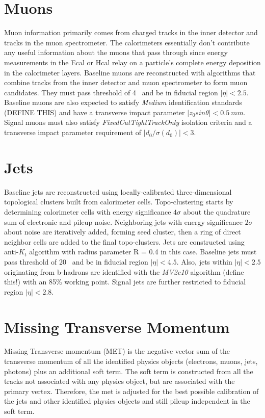\section{Muons}
Muon information primarily comes from charged tracks in the inner detector and tracks in the muon spectrometer.  The calorimeters essentially don't contribute any useful information about the muons that pass through since energy measurements in the Ecal or Hcal relay on a particle's complete energy deposition in the calorimeter layers.   Baseline muons are reconstructed with algorithms that combine tracks from the inner detector and muon spectrometer to form muon candidates.  They must pass \pt{} threshold of 4 ~\GeV and be in fiducial region $|\eta | < 2.5$. Baseline muons are also expected to satisfy \textit{Medium} identification standards (DEFINE THIS) and have a transverse impact parameter $|z_0sin\theta| < 0.5~mm$.  Signal muons must also satisfy \textit{FixedCutTightTrackOnly} isolation criteria and a transverse impact parameter requirement of $|d_0/\sigma(d_0)| < 3$.

\section{Jets}
Baseline jets are reconstructed using locally-calibrated three-dimensional topological clusters built from calorimeter cells.  Topo-clustering starts by determining calorimeter cells with energy significance $4\sigma$ about the quadrature sum of electronic and pileup noise.  Neighboring jets with energy significance $2\sigma$ about noise are iteratively added, forming seed cluster, then a ring of direct neighbor cells are added to the final topo-clusters.  Jets are constructed using anti-$K_t$ algorithm with radius parameter R = 0.4 in this case. Baseline jets must pass \pt{} threshold of 20 ~\GeV and be in fiducial region $|\eta | < 4.5$.  Also, jets within $|\eta | < 2.5$ originating from b-hadrons are identified with the \textit{MV2c10} algorithm (define this!) with an 85\% working point.  Signal jets are further restricted to fiducial region $|\eta | < 2.8$.



\section{Missing Transverse Momentum}
Missing Transverse momentum (MET) is the negative vector sum of the transverse momentum of all the identified physics objects (electrons, muons, jets, photons) plus an additional soft term.  The soft term is constructed from all the tracks not associated with any physics object, but are associated with the primary vertex.  Therefore, the met is adjusted for the best possible calibration of the jets and other identified physics objects and still pileup independent in the soft term. 

